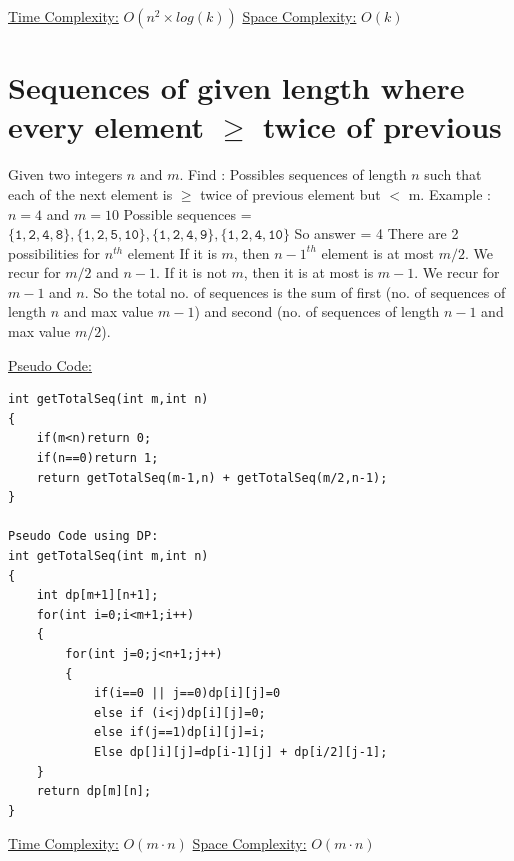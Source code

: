 \documentclass[12pt]{book}
\begin{document}
\underline{Time Complexity:}   $O(n^2 \times log(k))$\newline\newline
\underline{Space Complexity:}  $O(k)$\newline

\chapter{Sequences of given length where every element $\mathbf{\geq}$ twice of previous}
Given two integers $n$ and $m$.\newline
Find : Possibles sequences of length $n$ such that each of the next element is $\geq$ twice of previous element but $<$ m.\newline\newline
Example : $n = 4$ and $m = 10$\newline
Possible sequences = $\mathtt{\{1,2,4,8\}, \{1,2,5,10\}, \{1,2,4,9\}, \{1,2,4,10\}}$\newline
So answer = 4\newline\newline
There are 2 possibilities for $n^{th}$ element\newline
If it is $m$, then $n-1^{th}$ element is at most $m/2$. We recur for $m/2$ and $n-1$.\newline
If it is not $m$, then it is at most is $m-1$. We recur for $m-1$ and $n$.\newline
So the total no. of sequences is the sum of first (no. of sequences of length $n$ and max value $m-1$) and second (no. of sequences of length $n-1$ and max value $m/2$).\newline

\underline{Pseudo Code:}\newline
\begin{lstlisting}
int getTotalSeq(int m,int n)
{
	if(m<n)return 0;
	if(n==0)return 1;
	return getTotalSeq(m-1,n) + getTotalSeq(m/2,n-1);
}

Pseudo Code using DP:
int getTotalSeq(int m,int n)
{
	int dp[m+1][n+1];
	for(int i=0;i<m+1;i++)
	{
		for(int j=0;j<n+1;j++)
		{
			if(i==0 || j==0)dp[i][j]=0
			else if (i<j)dp[i][j]=0;
			else if(j==1)dp[i][j]=i;
			Else dp[]i][j]=dp[i-1][j] + dp[i/2][j-1];
	}
	return dp[m][n];
}
\end{lstlisting}
\underline{Time Complexity:}  $O(m \cdot n)$\newline\newline
\underline{Space Complexity:} $O(m \cdot n)$\newline\newline
\end{document}
